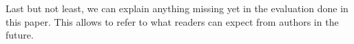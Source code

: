 \documentclass[A4,twocolumn]{article}
\begin{document}
Last but not least, we can explain anything missing yet in the evaluation
done in this paper. This allows to refer to what readers can expect from
authors in the future.

\nocite{hussein_original_2024,paul_rethinking_2021}




\end{document}
